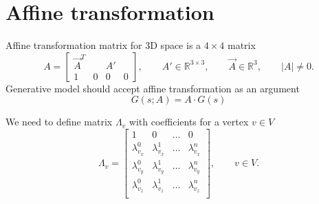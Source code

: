 \section{Affine transformation}

Affine transformation matrix for 3D space is a $4 \times 4$ matrix
\begin{equation}\label{eq:matrix:affine}
  A = \begin{bmatrix}
    \vec{A}^T  & & A' & \\
    1 & 0 & 0 & 0
  \end{bmatrix},
  \qquad A' \in \mathbb{R}^{3 \times 3},
  \qquad \vec{A} \in \mathbb{R}^3,
  \qquad \left| A \right| \neq 0.
\end{equation}
Generative model should accept affine transformation as an argument
\begin{equation*}
  G\left( s; A \right) = A \cdot G\left( s \right)
\end{equation*}

We need to define matrix $\Lambda_v$ with coefficients for
a vertex $v \in V$
\begin{equation*}
  \Lambda_v = \begin{bmatrix}
    1               & 0               & \dots & 0 \\
    \lambda^0_{v_x} & \lambda^1_{v_x} & \dots & \lambda^n_{v_x} \\
    \lambda^0_{v_y} & \lambda^1_{v_y} & \dots & \lambda^n_{v_y} \\
    \lambda^0_{v_z} & \lambda^1_{v_z} & \dots & \lambda^n_{v_z} \\
  \end{bmatrix},
  \qquad v \in V.
\end{equation*}

